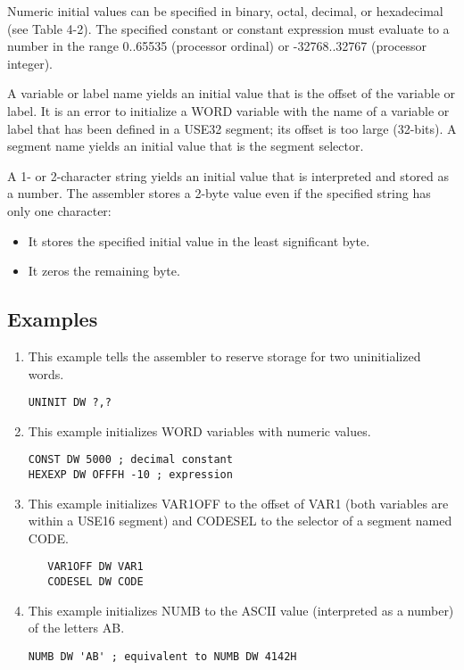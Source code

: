 Numeric initial values can be specified in binary, octal, decimal, or hexadecimal (see Table 4-2). The specified constant or constant expression must evaluate to a number in the range 0..65535 (processor ordinal) or -32768..32767 (processor integer).

A variable or label name yields an initial value that is the offset of the variable or label. It is an error to initialize a WORD variable with the name of a variable or label that has been defined in a USE32 segment; its offset is too large (32-bits). A segment name yields an initial value that is the segment selector.

A 1- or 2-character string yields an initial value that is interpreted and stored as a number. The assembler stores a 2-byte value even if the specified string has only one character:

\begin{itemize}
\item It stores the specified initial value in the least significant byte. 
\item It zeros the remaining byte.
\end{itemize}
\subsection*{Examples}
\begin{enumerate}
\item This example tells the assembler to reserve storage for two uninitialized words.
\begin{verbatim}
UNINIT DW ?,?
\end{verbatim}
\item This example initializes WORD variables with numeric values.
\begin{verbatim}
CONST DW 5000 ; decimal constant 
HEXEXP DW OFFFH -10 ; expression
\end{verbatim}
\item This example initializes VAR1OFF to the offset of VAR1 (both variables are within a USE16 segment) and CODESEL to the selector of a segment named CODE.
\begin{verbatim}
   VAR1OFF DW VAR1
   CODESEL DW CODE
   \end{verbatim}
\item This example initializes NUMB to the ASCII value (interpreted as a number) of the letters AB.
\begin{verbatim}
NUMB DW 'AB' ; equivalent to NUMB DW 4142H
\end{verbatim}
\end{enumerate}

